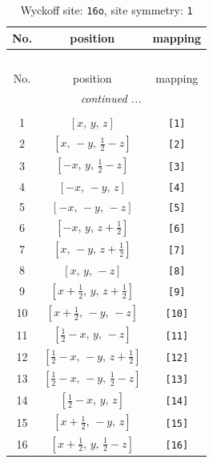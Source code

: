 \documentclass[fleqn,8pt]{jsarticle}
\begin{document}
\begin{longtable}{ccc}
\caption{Wyckoff site: {\tt 16o}, site symmetry: {\tt 1}}
 \\
 \hline \hline
No. & position & mapping \\ \hline \endfirsthead

\multicolumn{2}{l}{\tablename\ \thetable{}} \\
 \hline \hline
No. & position & mapping \\ \hline \endhead

 \hline \hline
\multicolumn{2}{r}{\footnotesize\it continued ...} \\ \endfoot

 \hline \hline
\multicolumn{2}{r}{} \\ \endlastfoot

1 & $\left[ x,\, y,\, z \right]$ & {\tt [1]} \\ \hline
2 & $\left[ x,\, - y,\, \frac{1}{2} - z \right]$ & {\tt [2]} \\ \hline
3 & $\left[ - x,\, y,\, \frac{1}{2} - z \right]$ & {\tt [3]} \\ \hline
4 & $\left[ - x,\, - y,\, z \right]$ & {\tt [4]} \\ \hline
5 & $\left[ - x,\, - y,\, - z \right]$ & {\tt [5]} \\ \hline
6 & $\left[ - x,\, y,\, z + \frac{1}{2} \right]$ & {\tt [6]} \\ \hline
7 & $\left[ x,\, - y,\, z + \frac{1}{2} \right]$ & {\tt [7]} \\ \hline
8 & $\left[ x,\, y,\, - z \right]$ & {\tt [8]} \\ \hline
9 & $\left[ x + \frac{1}{2},\, y,\, z + \frac{1}{2} \right]$ & {\tt [9]} \\ \hline
10 & $\left[ x + \frac{1}{2},\, - y,\, - z \right]$ & {\tt [10]} \\ \hline
11 & $\left[ \frac{1}{2} - x,\, y,\, - z \right]$ & {\tt [11]} \\ \hline
12 & $\left[ \frac{1}{2} - x,\, - y,\, z + \frac{1}{2} \right]$ & {\tt [12]} \\ \hline
13 & $\left[ \frac{1}{2} - x,\, - y,\, \frac{1}{2} - z \right]$ & {\tt [13]} \\ \hline
14 & $\left[ \frac{1}{2} - x,\, y,\, z \right]$ & {\tt [14]} \\ \hline
15 & $\left[ x + \frac{1}{2},\, - y,\, z \right]$ & {\tt [15]} \\ \hline
16 & $\left[ x + \frac{1}{2},\, y,\, \frac{1}{2} - z \right]$ & {\tt [16]} \\
\end{longtable}
\end{document}
